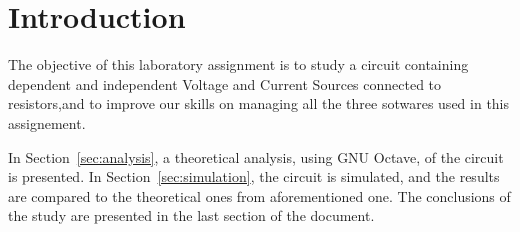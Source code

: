 \section{Introduction}
\label{sec:introduction}


The objective of this laboratory assignment is to study a circuit containing dependent and independent Voltage and Current Sources connected to resistors,and to improve our skills on managing all the three sotwares used in this assignement.
\vspace{1cm}


In Section~\ref{sec:analysis}, a theoretical analysis, using GNU Octave, of the circuit is presented. In Section~\ref{sec:simulation}, the circuit is simulated, and the results are compared to the theoretical ones from
aforementioned one. The conclusions of the study are presented in the last section of the document.
